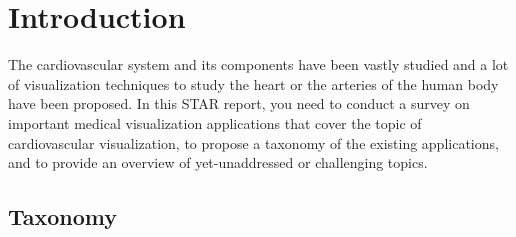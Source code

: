 \section{Introduction}

The cardiovascular system and its components have been vastly studied and a lot 
of visualization techniques to study the heart or the arteries of the human body 
have  been  proposed.  In  this  STAR  report,  you  need  to  conduct  a  survey  on 
important  medical  visualization  applications  that  cover  the  topic  of 
cardiovascular visualization, to propose a taxonomy of the existing applications, 
and to provide an overview of yet-unaddressed or challenging topics.  



\subsection{Taxonomy}

